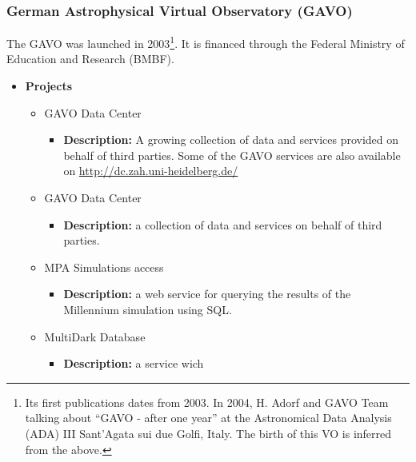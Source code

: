 \documentclass[11pt]{article}
\begin{document}
            \subsubsection{German Astrophysical Virtual Observatory (GAVO)}
                The GAVO was launched in 2003\footnote{Its first publications
dates from 2003. In 2004, H. Adorf and GAVO Team talking about ``GAVO - after
one year'' at the Astronomical Data Analysis (ADA) III Sant'Agata sui due Golfi,
Italy. The birth of this VO is inferred from the above.}. It is financed through
the Federal Ministry of Education and Research (BMBF).
                 
                \begin{itemize}
                    \item \textbf{Projects}
                        \begin{itemize}
                            \item GAVO Data Center
                                \begin{itemize}
                                    \item \textbf{Description:} A growing
collection of data and services provided on behalf of third parties. Some of the
GAVO services are also available on \url{http://dc.zah.uni-heidelberg.de/}
                                \end{itemize}
                            \item GAVO Data Center
                                \begin{itemize}
                                    \item \textbf{Description:} a collection of
data and services on behalf of third parties. 
                                \end{itemize}
                            \item MPA Simulations access
                                \begin{itemize}
                                    \item \textbf{Description:} a web service
for querying the results of the Millennium simulation using SQL.
                                \end{itemize}
                            \item MultiDark Database
                                \begin{itemize}
                                    \item \textbf{Description:} a service wich

\end{itemize}
\end{itemize}
\end{itemize}
\end{document}
